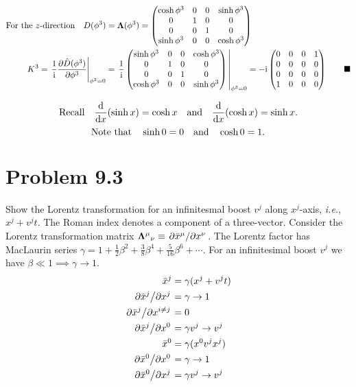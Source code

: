 \documentclass{article}
\begin{document}
\begin{align*}
	\qq*{For the $z$-direction}D(\phi^3)                                  & =\vb{\Lambda}(\phi^3)=\begin{pmatrix}
		\cosh{\phi^3} & 0 & 0 & \sinh{\phi^3} \\
		0             & 1 & 0 & 0             \\ 
		0             & 0 & 1 & 0             \\
		\sinh{\phi^3} & 0 & 0 & \cosh{\phi^3}
	\end{pmatrix}                                                                      \\
	K^3=\eval{\frac{1}{\text{i}}\pdv{\hat{D}(\phi^3)}{\phi^3}}_{\phi^3=0} & =\eval{\frac{1}{\text{i}}\begin{pmatrix}
			\sinh{\phi^3} & 0 & 0 & \cosh{\phi^3} \\
			0             & 1 & 0 & 0             \\ 
			0             & 0 & 1 & 0             \\
			\cosh{\phi^3} & 0 & 0 & \sinh{\phi^3}
		\end{pmatrix}}_{\phi^3=0}=-\text{i}\begin{pmatrix}
		0 & 0 & 0 & 1  \\
		0 & 0 & 0 & 0  \\
		0 & 0 & 0 & 0  \\
		1 & 0 & 0 & 0 
	\end{pmatrix}\qquad\blacksquare
\end{align*}

\[\qq*{Recall}\dv{x}(\sinh x)=\cosh x\qand\dv{x}(\cosh x)=\sinh x.\]
\[\qq*{Note that}\sinh 0=0\qand\cosh 0=1.\]



\section*{Problem 9.3}

Show the Lorentz transformation for an infinitesmal boost $v^j$ along $x^j$-axis, \emph{i.e.}, $x^j+v^j t$. The Roman index denotes a component of a three-vector. Consider the Lorentz transformation matrix ${\vb{\Lambda}^\mu}_\nu\equiv\pdv*{\bar{x}^\mu}{x^\nu}$. The Lorentz factor has MacLaurin series $\gamma=1+\frac{1}{2}\beta^2+\frac{3}{8}\beta^4+\frac{5}{16}\beta^6+\cdots$. For an infinitesimal boost $v^j $ we have $\beta\ll 1 \implies\gamma\to 1$. 
\begin{align*}
	\bar{x}^j                     & =\gamma(x^j+v^j t)  \\
	\pdv*{\bar{x}^j}{x^j}         & =\gamma\to 1        \\
	\pdv*{\bar{x}^j}{x^{i\neq j}} & =0                  \\
	\pdv*{\bar{x}^j}{x^0}         & =	\gamma v^j\to v^j  \\
	\bar{x}^0                     & =\gamma(x^0v^j x^j) \\
	\pdv*{\bar{x}^0}{x^0}         & =\gamma\to 1        \\
	\pdv*{\bar{x}^0}{x^j}         & =\gamma v^j\to v^j  \\
\end{align*}
\end{document}
